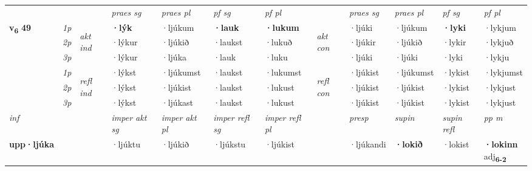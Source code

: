 \begin{longtable}[l]{X>{\footnotesize\itshape}llXXXXlXXXX}
\midrule

 & &   & \textit{praes sg}  & \textit{praes pl}    & \textit{ pf sg} & \textit{pf pl} & & \textit{praes sg}  & \textit{praes pl}    & \textit{pf sg} & \textit{pf pl }  \\ \cmidrule{4-7} \cmidrule{9-12}
 \multirow{2}{*}{{{\textbf{v{\textsubscript{6}}} \Large{\textbf{49}}}}}  & 1p & \multirow{3}{*}{\begin{turn}{90}\textit{akt ind}\end{turn}} & \textbf{·lýk} & ·ljúkum & \textbf{·lauk} & \textbf{·lukum} & \multirow{3}{*}{\begin{turn}{90}\textit{akt con}\end{turn}} &·ljúki & ·ljúkum & \textbf{·lyki} & ·lykjum\\*
 & 2p &  &  ·lýkur  & ·ljúkið & ·laukst & ·lukuð & & ·ljúkir & ·ljúkið & ·lykir & ·lykjuð \\*
 & 3p &  & ·lýkur & ·ljúka & ·lauk & ·luku & & ·ljúki & ·ljúki& ·lyki & ·lykju \\*
\cmidrule{4-7} \cmidrule{9-12}
 & 1p & \multirow{3}{*}{\begin{turn}{90}\textit{refl ind}\end{turn}}  & ·lýkst & ·ljúkumst & ·laukst & ·lukumst & \multirow{3}{*}{\begin{turn}{90}\textit{refl con}\end{turn}}  &·ljúkist & ·ljúkumst & ·lykist & ·lykjumst \\*
 & 2p &  & ·lýkst & ·ljúkist & ·laukst & ·lukust & &·ljúkist & ·ljúkist & ·lykist & ·lykjust \\*
 & 3p  & & ·lýkst & ·ljúkast & ·laukst & ·lukust & & ·ljúkist & ·ljúkist& ·lykist & ·lykjust \\*
\cmidrule{4-7} \cmidrule{9-12}

   {\textit{inf}} & &  & \textit{imper akt sg} & \textit{imper akt pl} & \textit{imper refl sg} & \textit{imper refl pl} && \textit{presp} & \textit{supin} & \textit{supin refl} & \textit{pp m} \\*
  {\textbf{upp\allowbreak ·ljúka}} & && ·ljúktu  & ·ljúkið & ·ljúkstu & ·ljúkist && ·ljúkandi &  \textbf{·lokið} & ·lokist & \specialcell{\textbf{·lokinn} \\ adj\textbf{\textsubscript{6-2}}} \\*

\midrule


\end{longtable}
